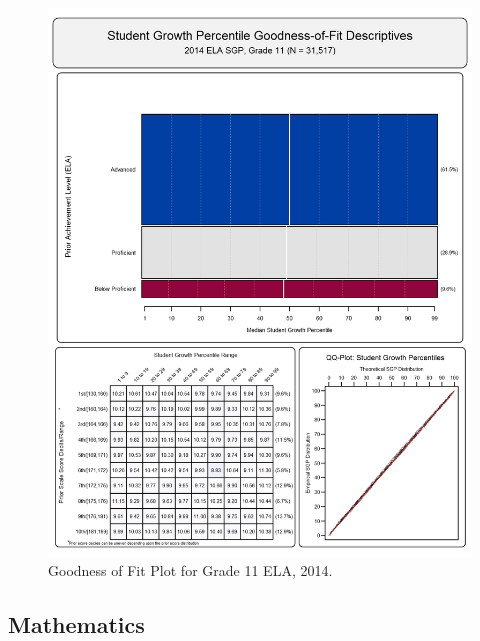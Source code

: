 \documentclass[12pt]{article}
\begin{document}
\begin{figure}[htbp]
\centering
\includegraphics{../img/Goodness_of_Fit/ELA.2014/2014_ELA_11;2013_ELA_10;2012_ELA_9;2011_ELA_8;2010_ELA_7;2009_ELA_6;2008_ELA_5.png}
\caption{Goodness of Fit Plot for Grade 11 ELA, 2014.}
\end{figure}

\clearpage 

\subsection{Mathematics}\label{mathematics}
\end{document}
